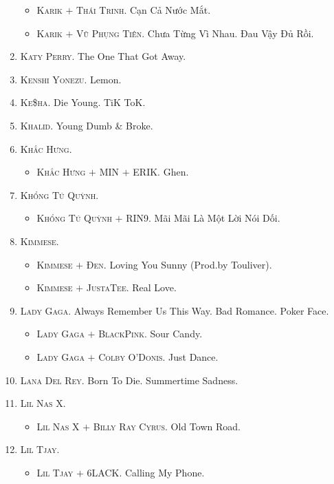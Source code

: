 \documentclass[oneside]{book}
\numberwithin{equation}{section}
\begin{document}
\begin{enumerate}
\begin{itemize}
		\item \textsc{Karik $+$ Thái Trinh.} Cạn Cả Nước Mắt.
		\item \textsc{Karik $+$ Vũ Phụng Tiên.} Chưa Từng Vì Nhau. Đau Vậy Đủ Rồi.
	\end{itemize}	
	\item \textsc{Katy Perry.} The One That Got Away.
	\item \textsc{Kenshi Yonezu.} Lemon.
	\item \textsc{Ke\$ha.} Die Young. TiK ToK.
	\item \textsc{Khalid.} Young Dumb \& Broke.
	\item \textsc{Khắc Hưng.}
	\begin{itemize}
		\item \textsc{Khắc Hưng $+$ MIN $+$ ERIK.} Ghen.
	\end{itemize}
	\item \textsc{Khổng Tú Quỳnh.}
	\begin{itemize}
		\item \textsc{Khổng Tú Quỳnh $+$ RIN9.} Mãi Mãi Là Một Lời Nói Dối.
	\end{itemize}
	\item \textsc{Kimmese.}
	\begin{itemize}
		\item \textsc{Kimmese $+$ Đen.} Loving You Sunny (Prod.by Touliver).
		\item \textsc{Kimmese $+$ JustaTee.} Real Love.
	\end{itemize}
	\item \textsc{Lady Gaga.} Always Remember Us This Way. Bad Romance. Poker Face.
	\begin{itemize}
		\item \textsc{Lady Gaga $+$ BlackPink.} Sour Candy.
		\item \textsc{Lady Gaga $+$ Colby O'Donis.} Just Dance.
	\end{itemize}
	\item \textsc{Lana Del Rey.} Born To Die. Summertime Sadness.
	\item \textsc{Lil Nas X.}
	\begin{itemize}
		\item \textsc{Lil Nas X $+$ Billy Ray Cyrus.} Old Town Road.
	\end{itemize}
	\item \textsc{Lil Tjay.}
	\begin{itemize}
		\item \textsc{Lil Tjay $+$ 6LACK.} Calling My Phone.
	\end{itemize}

\end{enumerate}
\end{document}
